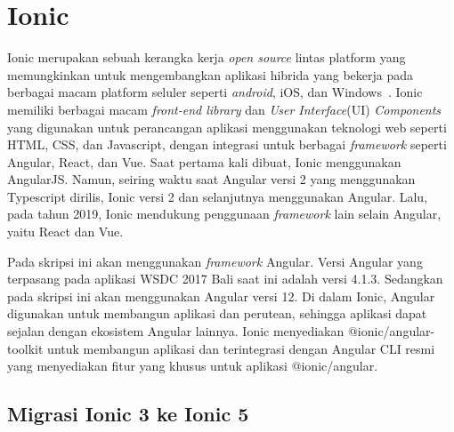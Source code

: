 \section{Ionic}
\label{sec:ionic} 
 
Ionic merupakan sebuah kerangka kerja {\it open source} lintas platform yang memungkinkan untuk mengembangkan aplikasi hibrida yang bekerja pada berbagai macam platform seluler seperti {\it android}, iOS, dan Windows~\cite{waranashiwar:18:ionic}. Ionic memiliki berbagai macam \textit{front-end library} dan \textit{User Interface}(UI) {\it Components} yang digunakan untuk  perancangan aplikasi menggunakan teknologi web seperti HTML, CSS, dan Javascript, dengan integrasi untuk berbagai \textit{framework} seperti Angular, React, dan Vue. Saat pertama kali dibuat, Ionic menggunakan AngularJS. Namun, seiring waktu saat Angular versi 2 yang menggunakan Typescript dirilis, Ionic versi 2 dan selanjutnya menggunakan Angular. Lalu, pada tahun 2019, Ionic mendukung penggunaan \textit{framework} lain selain Angular, yaitu React dan Vue.

Pada skripsi ini akan menggunakan {\it framework} Angular. Versi Angular yang terpasang pada aplikasi WSDC 2017 Bali saat ini adalah versi 4.1.3. Sedangkan pada skripsi ini akan menggunakan Angular versi 12.  Di dalam Ionic, Angular digunakan untuk membangun aplikasi dan perutean, sehingga aplikasi dapat sejalan dengan ekosistem Angular lainnya. Ionic menyediakan @ionic/angular-toolkit untuk membangun aplikasi dan terintegrasi dengan Angular CLI resmi yang menyediakan fitur yang khusus untuk aplikasi @ionic/angular.


\subsection{Migrasi Ionic 3 ke Ionic 5}
\label{subsec:migrasi}


